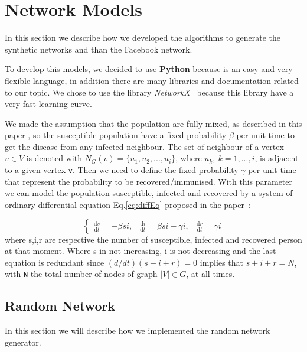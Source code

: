 
\section{Network Models}
    In this section we describe how we developed the algorithms to generate the synthetic networks and than the Facebook network.
    
    To develop this models, we decided to use \textbf{Python} because is an easy and very flexible language, in addition there are many libraries and documentation related to our topic.
    We chose to use the library \textit{NetworkX}~\cite{NetworkX} because this library have a very fast learning curve.
    
    We made the assumption that the population are fully mixed, as described in this paper \cite{witten2007simulations}, so the susceptible population have a fixed probability $\beta$ per unit time to get the disease from any infected neighbour. The set of neighbour of a vertex $v \in V$ is denoted with $N_G(v) = \{u_1, u_2, ..., u_i \}$, where $u_k,~k=1,...,i$, is adjacent to a given vertex \verb|v|.
    Then we need to define the fixed probability $\gamma$ per unit time that represent the probability to be recovered/immunised.
    With this parameter we can model the population susceptible, infected and recovered by a system of ordinary differential equation Eq.\ref{eq:diffEq} proposed in the paper~\cite{witten2007simulations}:
    
    \begin{equation}\label{eq:diffEq}
      \left\{\begin{matrix}
        \frac{\mathrm{d} s}{\mathrm{d} t} = -\beta si, & 
        \frac{\mathrm{d} i}{\mathrm{d} t} = \beta si - \gamma i,& 
        \frac{\mathrm{d} r}{\mathrm{d} t} = \gamma i
    \end{matrix}\right.
    \end{equation}
    where s,i,r are respective the number of susceptible, infected and recovered person at that moment.
    Where s in not increasing, i is not decreasing and the last equation is redundant since $(d/dt)(s + i + r) = 0$ implies that $s +i +r = N$, with \verb|N| the total number of nodes of graph $|V| \in G$, at all times.
    
    \subsection{Random Network}
        In this section we will describe how we implemented the random network generator.
        
